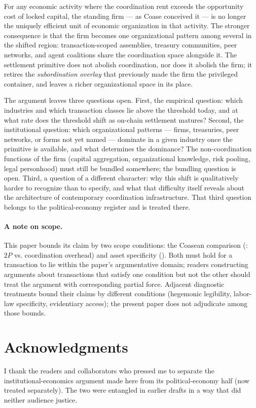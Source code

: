 \documentclass[11pt,a4paper]{article}
\theoremstyle{definition}
\theoremstyle{remark}
\newcommand{\pay}{P}
\begin{document}
For any economic activity where the coordination rent exceeds the
opportunity cost of locked capital, the standing firm --- as Coase
conceived it --- is no longer the uniquely efficient unit of
economic organization in that activity. The stronger consequence is
that the firm becomes one organizational pattern among several in
the shifted region: transaction-scoped assemblies, treasury
communities, peer networks, and agent coalitions share the
coordination space alongside it. The settlement primitive does not
abolish coordination, nor does it abolish the firm; it retires the
\emph{subordination overlay} that previously made the firm the
privileged container, and leaves a richer organizational space in
its place.

The argument leaves three questions open. First, the empirical
question: which industries and which transaction classes lie above
the threshold today, and at what rate does the threshold shift as
on-chain settlement matures? Second, the institutional question:
which organizational patterns --- firms, treasuries, peer networks,
or forms not yet named --- dominate in a given industry once the
primitive is available, and what determines the dominance? The
non-coordination functions of the firm (capital aggregation,
organizational knowledge, risk pooling, legal personhood) must
still be bundled somewhere; the bundling question is open. Third, a
question of a different character: why this shift is qualitatively
harder to recognize than to specify, and what that difficulty
itself reveals about the architecture of contemporary
coordination infrastructure. That third question belongs to the
political-economy register and is treated there.

\paragraph{A note on scope.}
This paper bounds its claim by two scope conditions: the Coasean
comparison (: $2\pay$ vs. coordination
overhead) and asset specificity (). Both must
hold for a transaction to lie within the paper's argumentative
domain; readers constructing arguments about transactions that
satisfy one condition but not the other should treat the
argument with corresponding partial force. Adjacent diagnostic
treatments bound their claims by different conditions (hegemonic
legibility, labor-law specificity, evidentiary access); the
present paper does not adjudicate among those bounds.

\section*{Acknowledgments}
I thank the readers and collaborators who pressed me to separate
the institutional-economics argument made here from its
political-economy half (now treated separately). The two were
entangled in earlier drafts in a way that did neither audience
justice.
\end{document}
